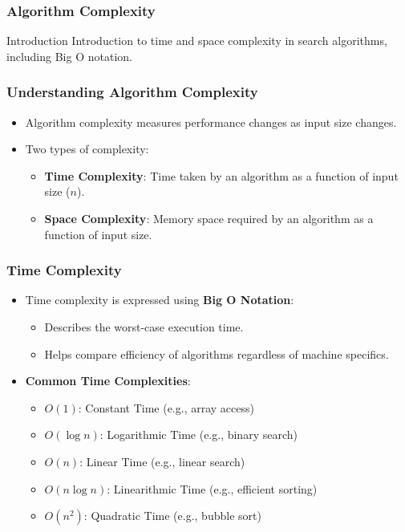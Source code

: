 \documentclass[aspectratio=169]{beamer}
\begin{document}
\begin{frame}
    \frametitle{Algorithm Complexity}
    \begin{block}{Introduction}
    Introduction to time and space complexity in search algorithms, including Big O notation.
    \end{block}
\end{frame}

\begin{frame}
    \frametitle{Understanding Algorithm Complexity}
    \begin{itemize}
        \item Algorithm complexity measures performance changes as input size changes.
        \item Two types of complexity:
        \begin{itemize}
            \item \textbf{Time Complexity}: Time taken by an algorithm as a function of input size ($n$).
            \item \textbf{Space Complexity}: Memory space required by an algorithm as a function of input size.
        \end{itemize}
    \end{itemize}
\end{frame}

\begin{frame}
    \frametitle{Time Complexity}
    \begin{itemize}
        \item Time complexity is expressed using \textbf{Big O Notation}:
        \begin{itemize}
            \item Describes the worst-case execution time.
            \item Helps compare efficiency of algorithms regardless of machine specifics.
        \end{itemize}
        \item \textbf{Common Time Complexities}:
        \begin{itemize}
            \item $O(1)$: Constant Time (e.g., array access)
            \item $O(\log n)$: Logarithmic Time (e.g., binary search)
            \item $O(n)$: Linear Time (e.g., linear search)
            \item $O(n \log n)$: Linearithmic Time (e.g., efficient sorting)
            \item $O(n^2)$: Quadratic Time (e.g., bubble sort)
        \end{itemize}
    \end{itemize}
\end{frame}
\end{document}
